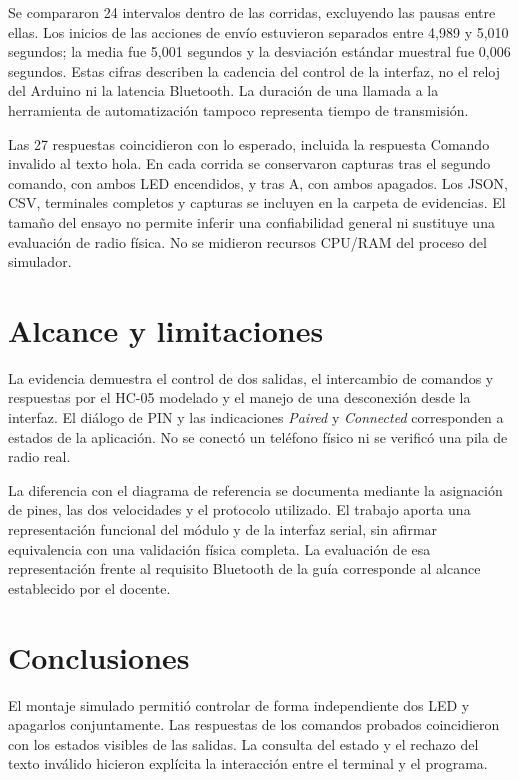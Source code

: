 \documentclass[10pt,a4paper,conference]{IEEEtran}
\begin{document}
Se compararon 24 intervalos dentro de las corridas, excluyendo las pausas entre ellas. Los inicios de las acciones de envío estuvieron separados entre 4,989 y 5,010 segundos; la media fue 5,001 segundos y la desviación estándar muestral fue 0,006 segundos. Estas cifras describen la cadencia del control de la interfaz, no el reloj del Arduino ni la latencia Bluetooth. La duración de una llamada a la herramienta de automatización tampoco representa tiempo de transmisión.

Las 27 respuestas coincidieron con lo esperado, incluida la respuesta Comando invalido al texto hola. En cada corrida se conservaron capturas tras el segundo comando, con ambos LED encendidos, y tras A, con ambos apagados. Los JSON, CSV, terminales completos y capturas se incluyen en la carpeta de evidencias. El tamaño del ensayo no permite inferir una confiabilidad general ni sustituye una evaluación de radio física. No se midieron recursos CPU/RAM del proceso del simulador.

\section{Alcance y limitaciones}
La evidencia demuestra el control de dos salidas, el intercambio de comandos y respuestas por el HC-05 modelado y el manejo de una desconexión desde la interfaz. El diálogo de PIN y las indicaciones \textit{Paired} y \textit{Connected} corresponden a estados de la aplicación. No se conectó un teléfono físico ni se verificó una pila de radio real.

La diferencia con el diagrama de referencia se documenta mediante la asignación de pines, las dos velocidades y el protocolo utilizado. El trabajo aporta una representación funcional del módulo y de la interfaz serial, sin afirmar equivalencia con una validación física completa. La evaluación de esa representación frente al requisito Bluetooth de la guía corresponde al alcance establecido por el docente.

\section{Conclusiones}
El montaje simulado permitió controlar de forma independiente dos LED y apagarlos conjuntamente. Las respuestas de los comandos probados coincidieron con los estados visibles de las salidas. La consulta del estado y el rechazo del texto inválido hicieron explícita la interacción entre el terminal y el programa.
\end{document}
